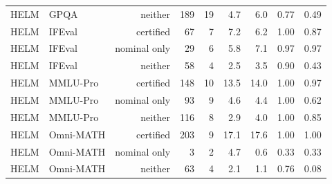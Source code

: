 \begin{longtable}{llrrrrrrr}
HELM & GPQA & neither & 189 & 19 & 4.7 & 6.0 & 0.77 & 0.49 \\
HELM & IFEval & certified & 67 & 7 & 7.2 & 6.2 & 1.00 & 0.87 \\
HELM & IFEval & nominal only & 29 & 6 & 5.8 & 7.1 & 0.97 & 0.97 \\
HELM & IFEval & neither & 58 & 4 & 2.5 & 3.5 & 0.90 & 0.43 \\
HELM & MMLU-Pro & certified & 148 & 10 & 13.5 & 14.0 & 1.00 & 0.97 \\
HELM & MMLU-Pro & nominal only & 93 & 9 & 4.6 & 4.4 & 1.00 & 0.62 \\
HELM & MMLU-Pro & neither & 116 & 8 & 2.9 & 4.0 & 1.00 & 0.85 \\
HELM & Omni-MATH & certified & 203 & 9 & 17.1 & 17.6 & 1.00 & 1.00 \\
HELM & Omni-MATH & nominal only & 3 & 2 & 4.7 & 0.6 & 0.33 & 0.33 \\
HELM & Omni-MATH & neither & 63 & 4 & 2.1 & 1.1 & 0.76 & 0.08 \\
\end{longtable}
